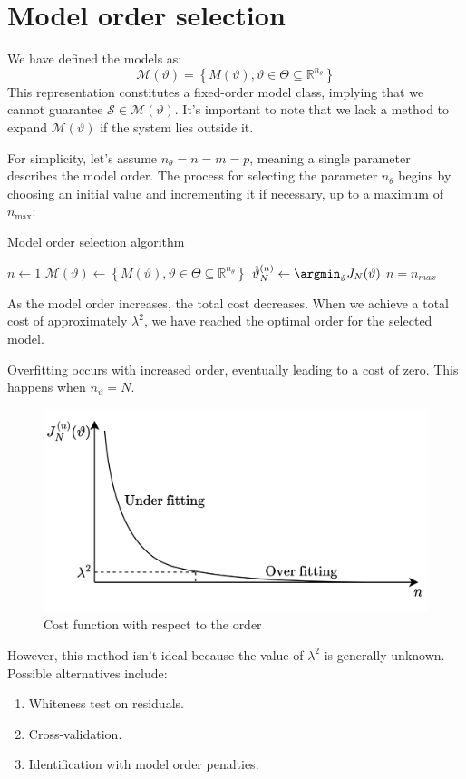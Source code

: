 \section{Model order selection}

We have defined the models as:
\[\mathcal{M}(\vartheta)=\left\{ M(\vartheta),\vartheta \in \Theta \subseteq \mathbb{R}^{n_\theta}\right\}\]
This representation constitutes a fixed-order model class, implying that we cannot guarantee  $\mathcal{S} \in \mathcal{M}(\vartheta)$. 
It's important to note that we lack a method to expand $\mathcal{M}(\vartheta)$ if the system lies outside it.

For simplicity, let's assume $n_\theta=n=m=p$, meaning a single parameter describes the model order.
The process for selecting the parameter $n_\theta$ begins by choosing an initial value and incrementing it if necessary, up to a maximum of $n_{\text{max}}$:
\begin{algorithm}[H]
    \caption{Model order selection algorithm}
        \begin{algorithmic}[1]
            \State $n \leftarrow 1$
            \Repeat 
                \State $\mathcal{M}(\vartheta)\leftarrow\left\{ M(\vartheta),\vartheta \in \Theta \subseteq \mathbb{R}^{n_\theta}\right\}$
                \State $\hat{\vartheta}_N^{(n)} \leftarrow \argmin_{\vartheta} J_N(\vartheta)$
            \Until $n=n_{max}$
        \end{algorithmic}
\end{algorithm}
As the model order increases, the total cost decreases.
When we achieve a total cost of approximately $\lambda^2$, we have reached the optimal order for the selected model.

Overfitting occurs with increased order, eventually leading to a cost of zero. 
This happens when $n_\vartheta=N$.
\begin{figure}[H]
    \centering
    \includegraphics[width=0.6\linewidth]{images/fitting.png}
    \caption{Cost function with respect to the order}
\end{figure}
However, this method isn't ideal because the value of $\lambda^2$ is generally unknown.
Possible alternatives include:
\begin{enumerate}
    \item Whiteness test on residuals.
    \item Cross-validation.
    \item Identification with model order penalties.
\end{enumerate}

